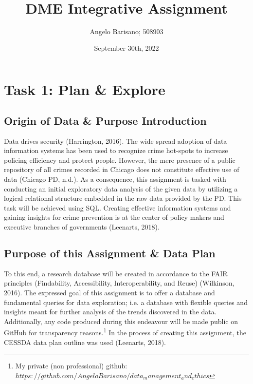 \documentclass[a4paper]{article}
\begin{document}
\title{DME Integrative Assignment}
\author{Angelo Barisano; 508903 }
\date{September 30th, 2022}
\maketitle

\newpage




\section{Task 1: Plan \& Explore}

\subsection{Origin of Data \& Purpose Introduction}
Data drives security (Harrington, 2016). The wide spread adoption of data information systems has been used to recognize crime hot-spots to increase policing efficiency and protect people. However, the mere presence of a public repository of all crimes recorded in Chicago does not constitute effective use of data (Chicago PD, n.d.). As a consequence, this assignment is tasked with conducting an initial exploratory data analysis of the given data by utilizing a logical relational structure embedded in the raw data provided by the PD. This task will be achieved using SQL. Creating effective information systems and gaining insights for crime prevention is at the center of policy makers and executive branches of governments (Leenarts, 2018). 



\subsection{Purpose of this Assignment \& Data Plan}

To this end, a research database will be created in accordance to the FAIR principles (Findability, Accessibility, Interoperability, and Reuse) (Wilkinson, 2016). The expressed goal of this assignment is to offer a database and fundamental queries for data exploration; i.e. a database with flexible queries and insights meant for further analysis of the trends discovered in the data. Additionally, any code produced during this endeavour will be made public on GitHub for transparency reasons.\footnote{My private (non professional) github: $https://github.com/AngeloBarisano/data_management_and_ethics$} In the process of creating this assignment, the CESSDA data plan outline was used (Leenarts, 2018).
\end{document}
